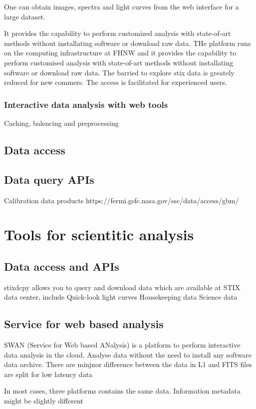 \documentclass{aa}
\begin{document}
One can obtain images, spectra and light curves from the web interface for a large dataset. 

It provides  the capability to perform customized analysis with state-of-art methods 
without installating software or download raw data.
THe platform runs on the computing infrastructure at FHNW and 
it provides  the capability to perform customised 
analysis with state-of-art methods without installating software or download raw data.
The barried to explore stix data is greately reduced for new commers. The
access is facilitated for experienced users.


\subsubsection{Interactive data analysis with web tools}
Caching, balencing and preprocessing

\subsection{Data access}
\subsection{Data query APIs}
Calibration data products
https://fermi.gsfc.nasa.gov/ssc/data/access/gbm/

\section{Tools for scientitic analysis }
\subsection{Data access and APIs}
\label{sec:apis}
stixdcpy allows you to query and download data which are available at STIX data center, include
Quick-look light curves
Housekeeping data
Science data
\subsection{Service for web based analysis}
SWAN (Service for Web based ANalysis)
 is a platform to perform interactive data analysis in the cloud.
Analyse data without the need to install any software
data archive. 
There are minjnor difference between the data in L1 and 
FITS files are split for low latency data 

In most cases, three platforms contains the same data. 
Information metadata might be slightly different 
\end{document}
